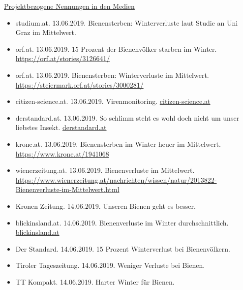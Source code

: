 \underline{Projektbezogene Nennungen in den Medien}

\begin{itemize}

    \item
    studium.at. 13.06.2019. Bienensterben: Winterverluste laut Studie an Uni Graz im Mittelwert.

    \item
    orf.at. 13.06.2019. 15 Prozent der Bienenvölker starben im Winter. \url{https://orf.at/stories/3126641/}

    \item
    orf.at. 13.06.2019. Bienensterben: Winterverluste im Mittelwert. \url{https://steiermark.orf.at/stories/3000281/}

    \item
    citizen-science.at. 13.06.2019. Virenmonitoring. \href{https://www.citizen-science.at/citizen-scienceprojekte/item/448-virenmonitoring}{citizen-science.at}

    \item
    derstandard.at. 13.06.2019. So schlimm steht es wohl doch nicht um unser liebstes Insekt. \href{https://www.derstandard.at/story/2000104810957/so-schlimm-steht-es-um-unser-liebstes-insekt-wohl-doch}{derstandard.at}

    \item
    krone.at. 13.06.2019. Bienensterben im Winter heuer im Mittelwert. \url{https://www.krone.at/1941068}

    \item
    wienerzeitung.at. 13.06.2019. Bienenverluste im Mittelwert. \url{https://www.wienerzeitung.at/nachrichten/wissen/natur/2013822-Bienenverluste-im-Mittelwert.html}

    \item
    Kronen Zeitung. 14.06.2019. Unseren Bienen geht es besser.

    \item
    blickinsland.at. 14.06.2019. Bienenverluste im Winter durchschnittlich. \href{https://blickinsland.at/bienenverlusteim-winter-durchschnittlich/}{blickinsland.at}

    \item
    Der Standard. 14.06.2019. 15 Prozent Winterverlust bei Bienenvölkern.

    \item
    Tiroler Tageszeitung. 14.06.2019. Weniger Verluste bei Bienen.

    \item
    TT Kompakt. 14.06.2019. Harter Winter für Bienen.


\end{itemize}

